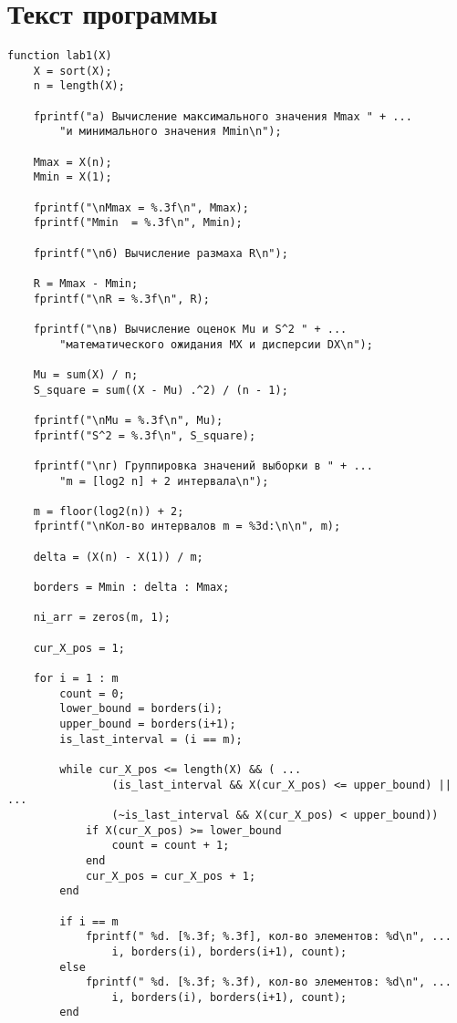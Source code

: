 \chapter{Текст программы}

\begin{center}
\captionsetup{justification=raggedright,singlelinecheck=off}
\begin{lstlisting}[label=lst:lab]
function lab1(X)
    X = sort(X);
    n = length(X);
    
    fprintf("а) Вычисление максимального значения Mmax " + ...
        "и минимального значения Mmin\n");
    
    Mmax = X(n);
    Mmin = X(1);
    
    fprintf("\nMmax = %.3f\n", Mmax);
    fprintf("Mmin  = %.3f\n", Mmin);
    
    fprintf("\nб) Вычисление размаха R\n");

    R = Mmax - Mmin;
    fprintf("\nR = %.3f\n", R);
    
    fprintf("\nв) Вычисление оценок Mu и S^2 " + ...
        "математического ожидания MX и дисперсии DX\n");
    
    Mu = sum(X) / n;
    S_square = sum((X - Mu) .^2) / (n - 1);
    
    fprintf("\nMu = %.3f\n", Mu);
    fprintf("S^2 = %.3f\n", S_square);
    
    fprintf("\nг) Группировка значений выборки в " + ...
        "m = [log2 n] + 2 интервала\n");
    
    m = floor(log2(n)) + 2; 
    fprintf("\nКол-во интервалов m = %3d:\n\n", m);
    
    delta = (X(n) - X(1)) / m;
    
    borders = Mmin : delta : Mmax;
    
    ni_arr = zeros(m, 1);
    
    cur_X_pos = 1;

    for i = 1 : m
        count = 0;
        lower_bound = borders(i);
        upper_bound = borders(i+1);
        is_last_interval = (i == m);
        
        while cur_X_pos <= length(X) && ( ...
                (is_last_interval && X(cur_X_pos) <= upper_bound) || ...
                (~is_last_interval && X(cur_X_pos) < upper_bound))
            if X(cur_X_pos) >= lower_bound
                count = count + 1;
            end
            cur_X_pos = cur_X_pos + 1;
        end
        
        if i == m
            fprintf(" %d. [%.3f; %.3f], кол-во элементов: %d\n", ...
                i, borders(i), borders(i+1), count);
        else
            fprintf(" %d. [%.3f; %.3f), кол-во элементов: %d\n", ...
                i, borders(i), borders(i+1), count);
        end
        

\end{lstlisting}
\end{center}
